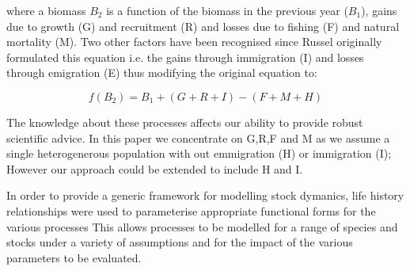 \documentclass[10pt]{article}
\begin{document}
where a biomass $B_2$ is a function of the biomass in the previous year ($B_1$), gains due to growth (G) and recruitment (R) and losses due to 
fishing (F) and natural mortality (M). Two other factors have been recognised since Russel originally formulated this equation i.e. 
the gains through immigration (I) and losses through emigration (E) thus modifying the original equation to:

\begin{equation}f(B_2) = B_1 + (G+R+I) - (F+M+H)\end{equation}

The knowledge about these processes affects our ability to provide robust scientific advice. In this paper we concentrate 
on G,R,F and M as we assume a single heterogenerous population with out emmigration (H) or immigration (I); However our approach could be extended to include H and I.

In order to provide a generic framework for modelling stock dymanics, life history relationships were used to parameterise appropriate functional forms for 
the various processes  This allows processes to be modelled for a range of species and stocks under a variety of assumptions and for the impact of the various parameters
to be evaluated.  
\end{document}
